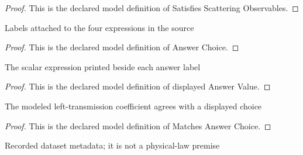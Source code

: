 \begin{proof}
  This is the declared model definition of Satisfies Scattering Observables.
\end{proof}
\begin{definition}
  \label{def:physics:phyx-mini-0601:phyxminiproblems-problemphyxmini0601-answerchoice}
  Labels attached to the four expressions in the source
\end{definition}
\begin{proof}
  This is the declared model definition of Answer Choice.
\end{proof}
\begin{definition}
  \label{def:physics:phyx-mini-0601:phyxminiproblems-problemphyxmini0601-displayedanswervalue}
  The scalar expression printed beside each answer label
\end{definition}
\begin{proof}
  This is the declared model definition of displayed Answer Value.
\end{proof}
\begin{definition}
  \label{def:physics:phyx-mini-0601:phyxminiproblems-problemphyxmini0601-matchesanswerchoice}
  The modeled left-transmission coefficient agrees with a displayed choice
\end{definition}
\begin{proof}
  This is the declared model definition of Matches Answer Choice.
\end{proof}
\begin{definition}
  \label{def:physics:phyx-mini-0601:phyxminiproblems-problemphyxmini0601-recordeddatasetanswer}
  Recorded dataset metadata; it is not a physical-law premise
\end{definition}
